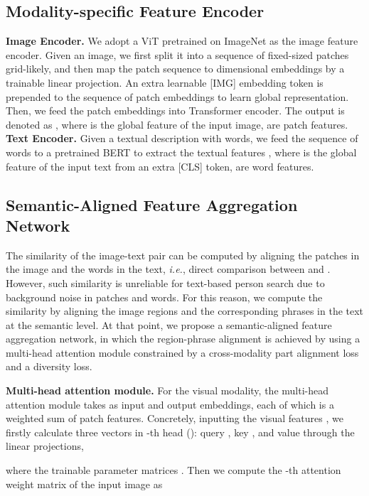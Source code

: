 \documentclass{article}
\begin{document}
\subsection{Modality-specific Feature Encoder}
  \textbf{Image Encoder.} We adopt a ViT \cite{dosovitskiy2021an} pretrained on ImageNet \cite{deng2009imagenet} as the image feature encoder. Given an image, we first split it into a sequence of  fixed-sized patches grid-likely, and then map the patch sequence to  dimensional embeddings by a trainable linear projection. An extra learnable [IMG] embedding token is prepended to the sequence of patch embeddings to learn global representation. Then, we feed the patch embeddings into Transformer encoder. The output is denoted as , where  is the global feature of the input image,  are patch features.\\
  \textbf{Text Encoder.}  Given a textual description with  words, we feed the sequence of words to a pretrained BERT \cite{devlin2018bert} to extract the textual features , where  is the global feature of the input text from an extra [CLS] token,  are word features.
\subsection{Semantic-Aligned Feature Aggregation Network}
The similarity of the image-text pair can be computed by aligning the patches in the image and the words in the text, \emph{i.e.}, direct comparison between  and . However, such similarity is unreliable for text-based
person search due to background noise in patches and words. For this reason, we compute the similarity by aligning the image regions and the corresponding phrases in the text at the semantic level. At that point, we propose a semantic-aligned feature aggregation network, in which the region-phrase alignment is achieved by using a multi-head attention \cite{vaswani2017attention} module constrained by a cross-modality part alignment loss and a diversity loss.  

\par 
\textbf{Multi-head attention module.} 
For the visual modality, the multi-head attention module takes  as input and output  embeddings, each of which is a weighted sum of patch features. 
Concretely, inputting the visual features , we firstly calculate three vectors in -th head (): query , key , and value  through the linear projections,

where the trainable parameter matrices . Then we compute the -th attention weight matrix  of the input image as
\end{document}
